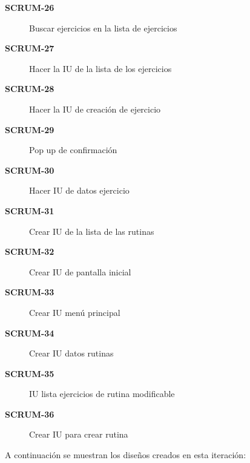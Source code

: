 \begin{description}
  \item[\textbf{SCRUM-26}] Buscar ejercicios en la lista de ejercicios
  \item[\textbf{SCRUM-27}] Hacer la IU de la lista de los ejercicios
  \item[\textbf{SCRUM-28}] Hacer la IU de creación de ejercicio
  \item[\textbf{SCRUM-29}] Pop up de confirmación
  \item[\textbf{SCRUM-30}] Hacer IU de datos ejercicio
  \item[\textbf{SCRUM-31}] Crear IU de la lista de las rutinas
  \item[\textbf{SCRUM-32}] Crear IU de pantalla inicial
  \item[\textbf{SCRUM-33}] Crear IU menú principal
  \item[\textbf{SCRUM-34}] Crear IU datos rutinas
  \item[\textbf{SCRUM-35}] IU lista ejercicios de rutina modificable
  \item[\textbf{SCRUM-36}] Crear IU para crear rutina
\end{description}

A continuación se muestran los diseños creados en esta iteración:

